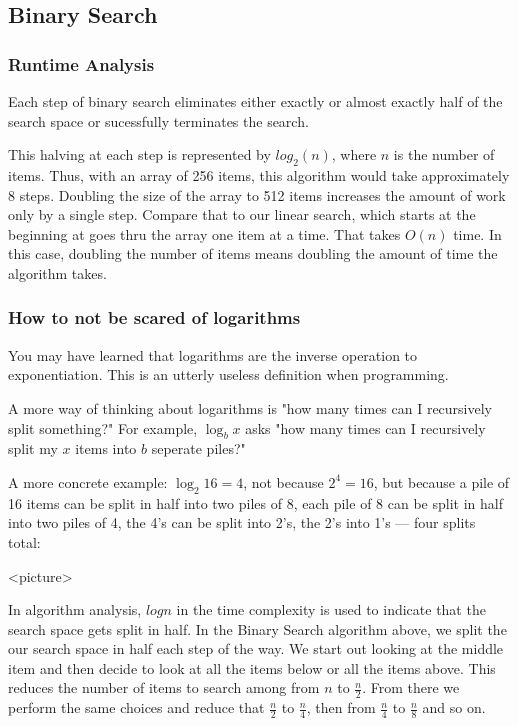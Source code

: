 \subsection{Binary Search}






\subsubsection{Runtime Analysis}
Each step of binary search eliminates either exactly or almost exactly half of the search space or sucessfully terminates the search.

This halving at each step is represented by $log_2(n)$, where $n$ is the number of items.  Thus, with an array of 256 items, this algorithm would take approximately 8 steps. Doubling the size of the array to 512 items increases the amount of work only by a single step.   Compare that to our linear search, which starts at the beginning at goes thru the array one item at a time.  That takes $O(n)$ time.  In this case, doubling the number of items means doubling the amount of time the algorithm takes.





\subsubsection{How to not be scared of logarithms }
You may have learned that logarithms are the inverse operation to exponentiation.
This is an utterly useless definition when programming.


A more way of thinking about logarithms is "how many times can I recursively split something?"
For example, $\log_b x$ asks "how many times can I recursively split my $x$ items into $b$ seperate piles?"

A more concrete example: $\log_2 16 = 4$, not because $2^4 = 16$, but because a pile of 16 items can be split in half into two piles of 8, each pile of 8 can be split in half into two piles of 4, the 4's can be split into 2's, the 2's into 1's --- four splits total:

<picture>


In algorithm analysis, $log n$ in the time complexity is used to indicate that the search space gets split in half.
In the Binary Search algorithm above, we split the our search space in half each step of the way.  We start out looking at the middle item and then decide to look at all the items below or all the items above.  This reduces the number of items to search among from $n$ to $\frac{n}{2}$.  From there we perform the same choices and reduce that $\frac{n}{2}$ to $\frac{n}{4}$, then from  $\frac{n}{4}$ to  $\frac{n}{8}$ and so on.

